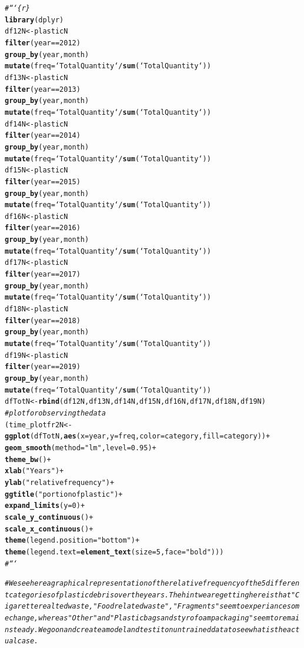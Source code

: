 \documentclass[10pt]{article}\usepackage[]{graphicx}\usepackage[]{color}
\makeatletter
\newcommand{\hlstr}[1]{\textcolor[rgb]{0.192,0.494,0.8}{#1}}%
\newcommand{\hlcom}[1]{\textcolor[rgb]{0.678,0.584,0.686}{\textit{#1}}}%
\newcommand{\hlkwd}[1]{\textcolor[rgb]{0.737,0.353,0.396}{\textbf{#1}}}%
\newenvironment{kframe}{%
 \def\at@end@of@kframe{}%
 \ifinner\ifhmode%
  \def\at@end@of@kframe{\end{minipage}}%
  \begin{minipage}{\columnwidth}%
 \fi\fi%
 \def\FrameCommand##1{\hskip\@totalleftmargin \hskip-\fboxsep
 \colorbox{shadecolor}{##1}\hskip-\fboxsep
     \hskip-\linewidth \hskip-\@totalleftmargin \hskip\columnwidth}%
 \MakeFramed {\advance\hsize-\width
   \@totalleftmargin\z@ \linewidth\hsize
   \@setminipage}}%
 {\par\unskip\endMakeFramed%
 \at@end@of@kframe}
\makeatother
\begin{document}
\begin{kframe}
\begin{alltt}
\hlcom{#```\{r\}}
\hlkwd{library}(dplyr)
df12N <- plasticN  %
  \hlkwd{filter}(year == 2012) %
  \hlkwd{group_by}(year, month) %
  \hlkwd{mutate}(freq = `Total Quantity` / \hlkwd{sum}(`Total Quantity`))
df13N <- plasticN  %
  \hlkwd{filter}(year == 2013) %
  \hlkwd{group_by}(year, month) %
  \hlkwd{mutate}(freq = `Total Quantity` / \hlkwd{sum}(`Total Quantity`))
df14N <- plasticN  %
  \hlkwd{filter}(year == 2014) %
  \hlkwd{group_by}(year, month) %
  \hlkwd{mutate}(freq = `Total Quantity` / \hlkwd{sum}(`Total Quantity`))
df15N <- plasticN  %
  \hlkwd{filter}(year == 2015) %
  \hlkwd{group_by}(year, month) %
  \hlkwd{mutate}(freq = `Total Quantity` / \hlkwd{sum}(`Total Quantity`))
df16N <- plasticN  %
  \hlkwd{filter}(year == 2016) %
  \hlkwd{group_by}(year, month) %
  \hlkwd{mutate}(freq = `Total Quantity` / \hlkwd{sum}(`Total Quantity`))
df17N <- plasticN  %
  \hlkwd{filter}(year == 2017) %
  \hlkwd{group_by}(year, month) %
  \hlkwd{mutate}(freq = `Total Quantity` / \hlkwd{sum}(`Total Quantity`))
df18N <- plasticN  %
  \hlkwd{filter}(year == 2018) %
  \hlkwd{group_by}(year, month) %
  \hlkwd{mutate}(freq = `Total Quantity` / \hlkwd{sum}(`Total Quantity`)) 
df19N <- plasticN  %
  \hlkwd{filter}(year == 2019) %
  \hlkwd{group_by}(year, month) %
  \hlkwd{mutate}(freq = `Total Quantity` / \hlkwd{sum}(`Total Quantity`)) 
dfTotN <- \hlkwd{rbind}(df12N, df13N, df14N, df15N, df16N, df17N, df18N, df19N)
\hlcom{# plot for observing the data}
(time_plotfr2N <- \hlkwd{ggplot}(dfTotN, \hlkwd{aes}(x = year, y = freq, color=category, fill = category)) +
  \hlkwd{geom_smooth}(method=\hlstr{"lm"}, level=0.95) +
  \hlkwd{theme_bw}() + 
  \hlkwd{xlab}(\hlstr{"Years"}) +
  \hlkwd{ylab}(\hlstr{"relative frequency"}) +
  \hlkwd{ggtitle}(\hlstr{"portion of plastic"}) + 
  \hlkwd{expand_limits}(y=0) +
  \hlkwd{scale_y_continuous}() + 
  \hlkwd{scale_x_continuous}()+
  \hlkwd{theme}(legend.position=\hlstr{"bottom"})+
  \hlkwd{theme}(legend.text = \hlkwd{element_text}(size=5, face=\hlstr{"bold"})))
\hlcom{#```}



\hlcom{#We see here a graphical representation of the relative frequency of the 5 different categories of plastic debris over the years. The hint we are getting here is that "Cigarette realted waste, "Food related waste", "Fragments" seem to experiance some change, whereas "Other" and "Plastic bags and styrofoam packaging" seem to remain steady. We go on and create a model and test it on untrained data to see what is the actual case.}


\end{alltt}
\end{kframe}
\end{document}
